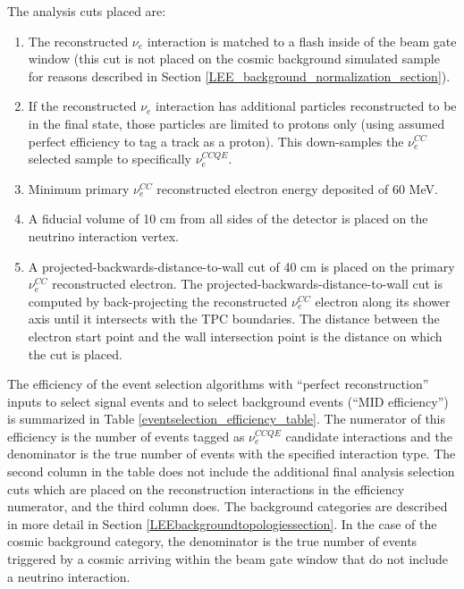 The analysis cuts placed are:
\begin{enumerate}
\item The reconstructed $\nu_e$ interaction is matched to a flash inside of the beam gate window (this cut is not placed on the cosmic background simulated sample for reasons described in Section \ref{LEE_background_normalization_section}).
\item If the reconstructed $\nu_e$ interaction has additional particles reconstructed to be in the final state, those particles are limited to protons only (using assumed perfect efficiency to tag a track as a proton). This down-samples the $\nu_e^{CC}$ selected sample to specifically $\nu_e^{CCQE}$.
\item Minimum primary $\nu_e^{CC}$ reconstructed electron energy deposited of 60 MeV.
\item A fiducial volume of 10 cm from all sides of the detector is placed on the neutrino interaction vertex.
\item A projected-backwards-distance-to-wall cut of 40 cm is placed on the primary $\nu_e^{CC}$ reconstructed electron. The projected-backwards-distance-to-wall cut is computed by back-projecting the reconstructed $\nu_e^{CC}$ electron along its shower axis until it intersects with the TPC boundaries. The distance between the electron start point and the wall intersection point is the distance on which the cut is placed.
\end{enumerate}



The efficiency of the event selection algorithms with ``perfect reconstruction'' inputs to select signal events and to select background events (``MID efficiency'') is summarized in Table \ref{eventselection_efficiency_table}. The numerator of this efficiency is the number of events tagged as $\nu_e^{CCQE}$ candidate interactions and the denominator is the true number of events with the specified interaction type. The second column in the table does not include the additional final analysis selection cuts which are placed on the reconstruction interactions in the efficiency numerator, and the third column does. The background categories are described in more detail in Section \ref{LEEbackgroundtopologiessection}. In the case of the cosmic background category, the denominator is the true number of events triggered by a cosmic arriving within the beam gate window that do not include a neutrino interaction.\\


